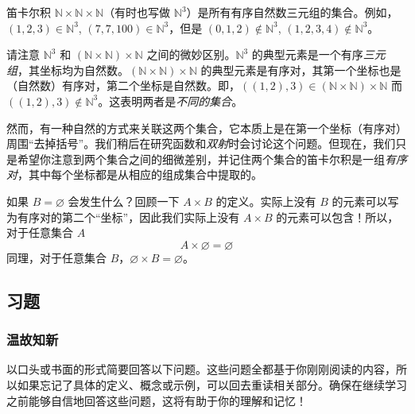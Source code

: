 \begin{example}
    笛卡尔积 $\mathbb{N} \times \mathbb{N} \times \mathbb{N}$（有时也写做 $\mathbb{N}^3$）是所有有序自然数三元组的集合。例如，$(1, 2, 3) \in \mathbb{N}^3$, $(7, 7, 100) \in \mathbb{N}^3$，但是 $(0, 1, 2) \notin \mathbb{N}^3$, $(1, 2, 3, 4) \notin \mathbb{N}^3$。
\end{example}

请注意 $\mathbb{N}^3$ 和 $(\mathbb{N} \times \mathbb{N}) \times \mathbb{N}$ 之间的微妙区别。$\mathbb{N}^3$ 的典型元素是一个有序\emph{三元组}，其坐标均为自然数。$(\mathbb{N} \times \mathbb{N}) \times \mathbb{N}$ 的典型元素是有序对，其第一个坐标也是（自然数）有序对，第二个坐标是自然数。即，$((1, 2), 3) \in (\mathbb{N} \times \mathbb{N}) \times \mathbb{N}$ 而 $((1, 2), 3) \notin \mathbb{N}^3$。这表明两者是\emph{不同的集合}。

然而，有一种自然的方式来关联这两个集合，它本质上是在第一个坐标（有序对）周围``去掉括号''。我们稍后在研究函数和\emph{双射}时会讨论这个问题。但现在，我们只是希望你注意到两个集合之间的细微差别，并记住两个集合的笛卡尔积是一组\emph{有序对}，其中每个坐标都是从相应的组成集合中提取的。\\

\begin{example}
    如果 $B = \varnothing$ 会发生什么？回顾一下 $A \times B$ 的定义。实际上没有 $B$ 的元素可以写为有序对的第二个``坐标''，因此我们实际上没有 $A \times B$ 的元素可以包含！所以，对于任意集合 $A$
    \[A \times \varnothing = \varnothing\]
    同理，对于任意集合 $B$，$\varnothing \times B = \varnothing$。
\end{example}

\subsection{习题}

\subsubsection*{温故知新}

以口头或书面的形式简要回答以下问题。这些问题全都基于你刚刚阅读的内容，所以如果忘记了具体的定义、概念或示例，可以回去重读相关部分。确保在继续学习之前能够自信地回答这些问题，这将有助于你的理解和记忆！

